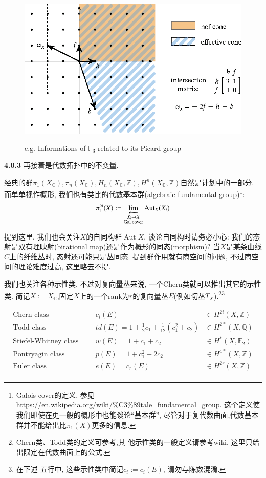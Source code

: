 \documentclass[UTF8,12pt,twoside]{article}
\theoremstyle{definition}
\newcommand{\ZZ}{\mathbb{Z}}  %
\newcommand{\QQ}{\mathbb{Q}}  %
\newcommand{\CC}{\mathbb{C}}  %
\newcommand{\Aut}{\operatorname{Aut}}
\numberwithin{equation}{section}
\begin{document}
\begin{figure}[ht]
	\vspace{0cm}
	\centering
	\includegraphics[width=12cm]{9-7-fig/picofF385.eps}
	\label{fig:PicofF3}
	\captionsetup{labelformat=empty}
	\caption{e.g. Informations of $\mathbb{F}_3$ related to its Picard group}
\end{figure}


\textbf{4.0.3} 再接着是代数拓扑中的不变量.

经典的群$\pi_1(X_{\CC}),\pi_n(X_{\CC}),H_n(X_{\CC},\ZZ),H^n(X_{\CC},\ZZ)$自然是计划中的一部分. 而单单视作概形, 我们也有类比的代数基本群(algebraic fundamental group)\footnote{Galois cover的定义, 参见\url{https://en.wikipedia.org/wiki/\%C3\%89tale_fundamental_group}. 这个定义使我们即使在更一般的概形中也能谈论“基本群”, 尽管对于复代数曲面,代数基本群并不能给出比$\pi_1(X)$更多的信息.}:
$$\pi_1^{\text{ét}}(X):=\varprojlim_{\substack{X_i\rightarrow X \\ \text{Gal cover} }} \Aut_X(X_i)$$

提到这里, 我们也会关注$X$的自同构群$\Aut X$. 谈论自同构时请务必小心: 我们的态射是双有理映射(birational map)还是作为概形的同态(morphism)? 当$X$是某条曲线$C$上的纤维丛时, 态射还可能只是丛同态. 提到群作用就有商空间的问题, 不过商空间的理论难度过高, 这里略去不提.

我们也关注各种示性类, 不过对复向量丛来说, 一个Chern类就可以推出其它的示性类. 简记$X:=X_{\CC}$,固定$X$上的一个rank为$r$的复向量丛$E$(例如切丛$T_X$).\footnote{Chern类、Todd类的定义可参考\cite[Class 18]{vakil2004algsurf},其 他示性类的一般定义请参考wiki. 这里只给出限定在代数曲面上的公式.}\footnote{在下述 五行中, 这些示性类中简记$c_i:=c_i(E)$, 请勿与陈数混淆.} 

\begin{equation*}
\begin{aligned}
\text{Chern class}& & & c_i(E) & \in H^{2i}(X,\ZZ) \\
\text{Todd class}& & &td(E)=1+\frac{1}{2}c_1+\frac{1}{12}(c_1^2+c_2) & \in H^{2*}(X,\QQ) \\
\text{Stiefel-Whitney class}& & &w(E)=1+c_1+c_2 & \in H^{*}(X,\mathbb{F}_2) \\
\text{Pontryagin class}& & &p(E)=1+c_1^2-2c_2 & \in H^{4*}(X,\ZZ) \\
\text{Euler class}& & &e(E)=c_r(E) & \in H^{2r}(X,\ZZ) \\
\end{aligned}
\end{equation*}
\end{document}
